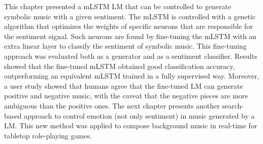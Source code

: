 
This chapter presented a mLSTM LM that can be controlled to generate symbolic music with a given sentiment. The mLSTM is controlled with a genetic algorithm that optimizes the weights of specific neurons that are responsible for the sentiment signal. Such neurons are found by fine-tuning the mLSTM with an extra linear layer to classify the sentiment of symbolic music. This fine-tuning approach was evaluated both as a generator and as a sentiment classifier. Results showed that the fine-tuned mLSTM obtained good classification accuracy, outperforming an equivalent mLSTM trained in a fully supervised way. Moreover, a user study showed that humans agree that the fine-tuned LM can generate positive and negative music, with the caveat that the negative pieces are more ambiguous than the positive ones. The next chapter presents another search-based approach to control emotion (not only sentiment) in music generated by a LM. This new method was applied to compose background music in real-time for tabletop role-playing games\cite{padovani2017bardo}.




